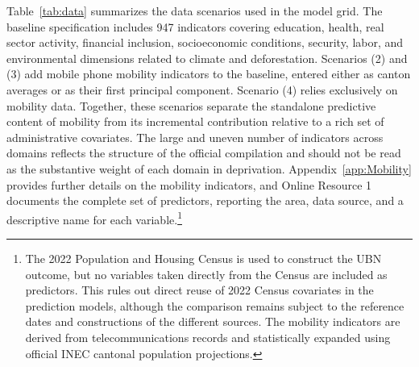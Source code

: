 \documentclass[pdflatex,sn-apa]{sn-jnl}
\begin{document}
Table~\ref{tab:data} summarizes the data scenarios used in the model grid. The baseline specification includes 947 indicators covering education, health, real sector activity, financial inclusion, socioeconomic conditions, security, labor, and environmental dimensions related to climate and deforestation. Scenarios (2) and (3) add mobile phone mobility indicators to the baseline, entered either as canton averages or as their first principal component. Scenario (4) relies exclusively on mobility data. Together, these scenarios separate the standalone predictive content of mobility from its incremental contribution relative to a rich set of administrative covariates. The large and uneven number of indicators across domains reflects the structure of the official compilation and should not be read as the substantive weight of each domain in deprivation. Appendix~\ref{app:Mobility} provides further details on the mobility indicators, and Online Resource 1 documents the complete set of predictors, reporting the area, data source, and a descriptive name for each variable.\footnote{The 2022 Population and Housing Census is used to construct the UBN outcome, but no variables taken directly from the Census are included as predictors. This rules out direct reuse of 2022 Census covariates in the prediction models, although the comparison remains subject to the reference dates and constructions of the different sources. The mobility indicators are derived from telecommunications records and statistically expanded using official INEC cantonal population projections.}
\end{document}
